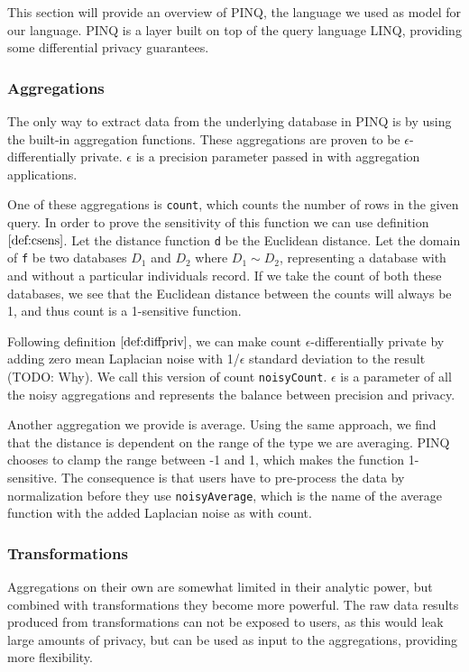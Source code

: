 \documentclass[12pt]{article}
\begin{document}
This section will provide an overview of PINQ, the language we used as model for our language. PINQ is a layer built on top of the query language LINQ, providing some differential privacy guarantees.

\subsubsection{Aggregations}

The only way to extract data from the underlying database in PINQ is by using the built-in aggregation functions. These aggregations are proven to be $\epsilon$-differentially private. $\epsilon$ is a precision parameter passed in with aggregation applications.

One of these aggregations is \texttt{count}, which counts the number of rows in the given query. In order to prove the sensitivity of this function we can use definition $\ref{def:csens}$. 
Let the distance function \texttt{d} be the Euclidean distance. Let the domain of \texttt{f} be two databases $D_1$ and $D_2$ where $D_1 \sim D_2$, representing a database with and without a particular individuals record. If we take the count of both these databases, we see that the Euclidean distance between the counts will always be 1, and thus count is a 1-sensitive function.

Following definition $\ref{def:diffpriv}$, we can make count $\epsilon$-differentially private by adding zero mean Laplacian noise with 1/$\epsilon$ standard deviation to the result (TODO: Why). We call this version of count \texttt{noisyCount}. $\epsilon$ is a parameter of all the noisy aggregations and represents the balance between precision and privacy.

Another aggregation we provide is average. Using the same approach, we find that the distance is dependent on the range of the type we are averaging. PINQ chooses to clamp the range between -1 and 1, which makes the function 1-sensitive. The consequence is that users have to pre-process the data by normalization before they use \texttt{noisyAverage}, which is the name of the average function with the added Laplacian noise as with count.

\subsubsection{Transformations}

Aggregations on their own are somewhat limited in their analytic power, but combined with transformations they become more powerful.
The raw data results produced from transformations can not be exposed to users, as this would leak large amounts of privacy, but can be used as input to the aggregations, providing more flexibility.
\end{document}
